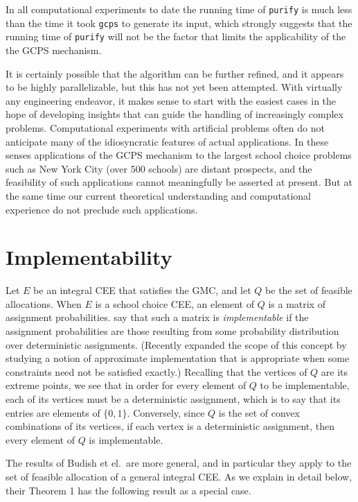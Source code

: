 \documentclass[12pt]{article}
\theoremstyle{definition}
\begin{document}
In all computational experiments to date the running time of \texttt{purify} is much less than the time it took \texttt{gcps} to generate its input, which strongly suggests that the running time of \texttt{purify} will not be the factor that limits the applicability of the the GCPS mechanism.

It is certainly possible that the algorithm can be further refined, and it appears to be highly parallelizable, but this has not yet been attempted.  With virtually any engineering endeavor, it makes sense to start with the easiest cases in the hope of developing insights that can guide the handling of increasingly complex problems.  Computational experiments with artificial problems often do not anticipate many of the idiosyncratic features of actual applications.
In these senses applications of the GCPS mechanism to the largest school choice problems such as New York City (over 500 schools) are distant prospects, and the feasibility of such applications cannot meaningfully be asserted at present.  But at the same time our current theoretical understanding and computational experience do not preclude such applications.

\section{Implementability} \label{sec:Implementability}

Let $E$ be an integral CEE that satisfies the GMC, and let $Q$ be the set of feasible allocations. When $E$ is a school choice CEE, an element of $Q$ is a matrix of assignment probabilities.   \cite{bckm13aer} say that such a matrix is \emph{implementable} if the assignment probabilities are those resulting from some probability distribution over deterministic assignments. 
(Recently \cite{AkNi20} expanded the scope of this concept by studying a notion of approximate implementation that is appropriate when some constraints need not be satisfied exactly.)  Recalling that the vertices of $Q$ are its extreme points, we see that in order for every element of $Q$ to be implementable, each of its vertices must be a deterministic assignment, which is to say that its entries are elements of $\{0,1\}$.  Conversely, since $Q$ is the set of convex combinations of its vertices, if each vertex is a deterministic assignment, then every element of $Q$ is implementable.

The results of Budish et el.~are more general, and in particular they apply to the set of feasible allocation of a general integral CEE.  As we explain in detail below, their Theorem 1 has the following result as a special case.
\end{document}
